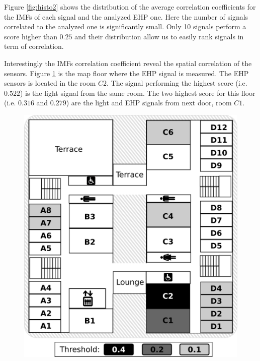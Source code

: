 Figure \ref{fig:histo2} shows the distribution of the average correlation coefficients for the IMFs of each signal and the analyzed EHP one.
Here the number of signals correlated to the analyzed one is significantly small. 
Only 10 signals perform a score higher than $0.25$ and their distribution allow us to easily rank signals in term of correlation.

Interestingly the IMFs correlation coefficient reveal the spatial correlation of the sensors.
Figure \ref{fig:map} is the map floor where the EHP signal is measured.
The EHP sensors is located in the room $C2$.
The signal performing the highest score (i.e. $0.522$) is the light signal from the same room.
The two highest score for this floor (i.e. $0.316$ and $0.279$) are the light and EHP signals from next door, room $C1$.

\begin{figure}
\includegraphics[width=.5\textwidth]{img/floorMap.png}
\caption{}
\label{fig:map}
\end{figure}
